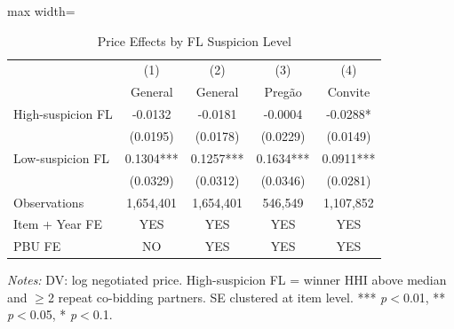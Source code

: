 \begin{table}[htbp]
\centering
\caption{Price Effects by FL Suspicion Level}
\label{tab:network_split}
\begin{adjustbox}{max width=\textwidth}
\begin{threeparttable}
\small
\begin{tabular}{lcccc}
\toprule
 & (1) & (2) & (3) & (4) \\
 & General & General & Preg\~{a}o & Convite \\
\midrule
High-suspicion FL & -0.0132 & -0.0181 & -0.0004 & -0.0288* \\
 & (0.0195) & (0.0178) & (0.0229) & (0.0149) \\
Low-suspicion FL & 0.1304*** & 0.1257*** & 0.1634*** & 0.0911*** \\
 & (0.0329) & (0.0312) & (0.0346) & (0.0281) \\
\midrule
Observations & 1,654,401 & 1,654,401 & 546,549 & 1,107,852 \\
Item + Year FE & YES & YES & YES & YES \\
PBU FE & NO & YES & YES & YES \\
\bottomrule
\end{tabular}
\begin{tablenotes}
\small
\item \textit{Notes:} DV: log negotiated price.
High-suspicion FL = winner HHI above median and $\geq$2 repeat co-bidding partners.
SE clustered at item level.
*** \textit{p}$<$0.01, ** \textit{p}$<$0.05, * \textit{p}$<$0.1.
\end{tablenotes}
\end{threeparttable}
\end{adjustbox}
\end{table}
